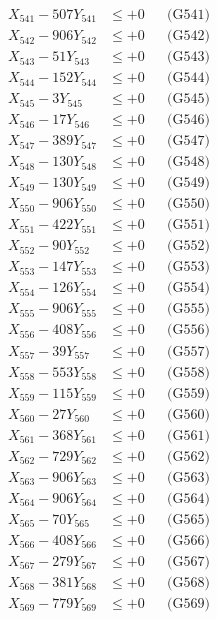 \documentclass[a4paper,10pt]{article}
\begin{document}
{\begin{align}
\allowbreak
X_{541} - 507Y_{541} &\leq +0 && \text{(G541)} \\
X_{542} - 906Y_{542} &\leq +0 && \text{(G542)} \\
X_{543} - 51Y_{543} &\leq +0 && \text{(G543)} \\
X_{544} - 152Y_{544} &\leq +0 && \text{(G544)} \\
X_{545} - 3Y_{545} &\leq +0 && \text{(G545)} \\
X_{546} - 17Y_{546} &\leq +0 && \text{(G546)} \\
X_{547} - 389Y_{547} &\leq +0 && \text{(G547)} \\
X_{548} - 130Y_{548} &\leq +0 && \text{(G548)} \\
X_{549} - 130Y_{549} &\leq +0 && \text{(G549)} \\
X_{550} - 906Y_{550} &\leq +0 && \text{(G550)} \\
\allowbreak
X_{551} - 422Y_{551} &\leq +0 && \text{(G551)} \\
X_{552} - 90Y_{552} &\leq +0 && \text{(G552)} \\
X_{553} - 147Y_{553} &\leq +0 && \text{(G553)} \\
X_{554} - 126Y_{554} &\leq +0 && \text{(G554)} \\
X_{555} - 906Y_{555} &\leq +0 && \text{(G555)} \\
X_{556} - 408Y_{556} &\leq +0 && \text{(G556)} \\
X_{557} - 39Y_{557} &\leq +0 && \text{(G557)} \\
X_{558} - 553Y_{558} &\leq +0 && \text{(G558)} \\
X_{559} - 115Y_{559} &\leq +0 && \text{(G559)} \\
X_{560} - 27Y_{560} &\leq +0 && \text{(G560)} \\
\allowbreak
X_{561} - 368Y_{561} &\leq +0 && \text{(G561)} \\
X_{562} - 729Y_{562} &\leq +0 && \text{(G562)} \\
X_{563} - 906Y_{563} &\leq +0 && \text{(G563)} \\
X_{564} - 906Y_{564} &\leq +0 && \text{(G564)} \\
X_{565} - 70Y_{565} &\leq +0 && \text{(G565)} \\
X_{566} - 408Y_{566} &\leq +0 && \text{(G566)} \\
X_{567} - 279Y_{567} &\leq +0 && \text{(G567)} \\
X_{568} - 381Y_{568} &\leq +0 && \text{(G568)} \\
X_{569} - 779Y_{569} &\leq +0 && \text{(G569)} \\

\end{align}}
\end{document}
